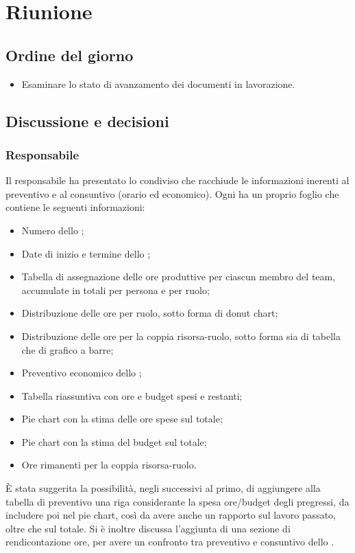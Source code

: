 \section{Riunione}
\subsection{Ordine del giorno}
\begin{itemize}
	\item Esaminare lo stato di avanzamento dei documenti in lavorazione.
\end{itemize}

\subsection{Discussione e decisioni}

\subsubsection{Responsabile}
Il responsabile ha presentato lo  condiviso che racchiude le informazioni inerenti al preventivo e al consuntivo (orario ed economico). Ogni  ha un proprio foglio che contiene le seguenti informazioni:
\begin{itemize}
	\item Numero dello ;
	\item Date di inizio e termine dello ;
	\item Tabella di assegnazione delle ore produttive per ciascun membro del team, accumulate in totali per persona e per ruolo;
	\item Distribuzione delle ore per ruolo, sotto forma di donut chart;
	\item Distribuzione delle ore per la coppia risorsa-ruolo, sotto forma sia di tabella che di grafico a barre;
	\item Preventivo economico dello ;
	\item Tabella riassuntiva con ore e budget spesi e restanti;
	\item Pie chart con la stima delle ore spese sul totale;
	\item Pie chart con la stima del budget sul totale;
	\item Ore rimanenti per la coppia risorsa-ruolo.
\end{itemize}

\vspace{0.5\baselineskip}
È stata suggerita la possibilità, negli  successivi al primo, di aggiungere alla tabella di preventivo una riga considerante la spesa ore/budget degli  pregressi, da includere poi nel pie chart, così da avere anche un rapporto sul lavoro passato, oltre che sul totale. Si è inoltre discussa l'aggiunta di una sezione di rendicontazione ore, per avere un confronto tra preventivo e consuntivo dello .


